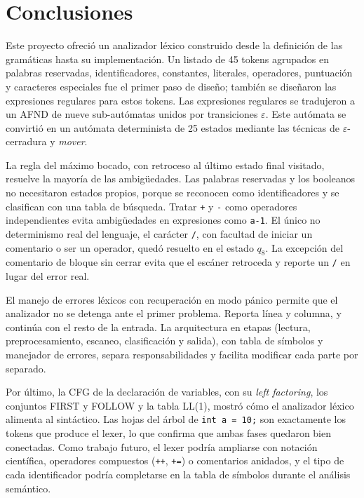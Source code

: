 \documentclass[12pt,letterpaper]{article}
\newcommand{\cd}[1]{\texttt{#1}}                       %
\begin{document}
\section{Conclusiones}
Este proyecto ofreció un analizador léxico construido desde la definición de las gramáticas hasta su implementación. Un listado de 45 tokens agrupados en palabras reservadas, identificadores, constantes, literales, operadores, puntuación y caracteres especiales fue el primer paso de diseño; también se diseñaron las expresiones regulares para estos tokens. Las expresiones regulares se tradujeron a un AFND de nueve sub-autómatas unidos por transiciones $\varepsilon$. Este autómata se convirtió en un autómata determinista de 25 estados mediante las técnicas de $\varepsilon$-cerradura y \textit{mover}.

La regla del máximo bocado, con retroceso al último estado final visitado, resuelve la mayoría de las ambigüedades. Las palabras reservadas y los booleanos no necesitaron estados propios, porque se reconocen como identificadores y se clasifican con una tabla de búsqueda. Tratar \cd{+} y \cd{-} como operadores independientes evita ambigüedades en expresiones como \cd{a-1}. El único no determinismo real del lenguaje, el carácter \cd{/}, con facultad de iniciar un comentario o ser un operador, quedó resuelto en el estado $q_8$. La excepción del comentario de bloque sin cerrar evita que el escáner retroceda y reporte un \cd{/} en lugar del error real.

El manejo de errores léxicos con recuperación en modo pánico permite que el analizador no se detenga ante el primer problema. Reporta línea y columna, y continúa con el resto de la entrada. La arquitectura en etapas (lectura, preprocesamiento, escaneo, clasificación y salida), con tabla de símbolos y manejador de errores, separa responsabilidades y facilita modificar cada parte por separado.

Por último, la CFG de la declaración de variables, con su \textit{left factoring}, los conjuntos FIRST y FOLLOW y la tabla LL(1), mostró cómo el analizador léxico alimenta al sintáctico. Las hojas del árbol de \cd{int a = 10;} son exactamente los tokens que produce el lexer, lo que confirma que ambas fases quedaron bien conectadas. Como trabajo futuro, el lexer podría ampliarse con notación científica, operadores compuestos (\cd{++}, \cd{+=}) o comentarios anidados, y el tipo de cada identificador podría completarse en la tabla de símbolos durante el análisis semántico.
\end{document}
